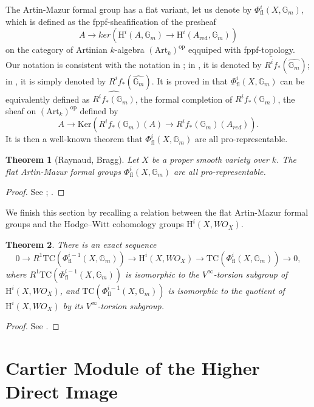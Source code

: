 \documentclass[a4paper,12pt,twoside]{report}
\newtheorem{theorem}{Theorem}[section]
\newcommand{\G}{\mathbb{G}}
\newcommand{\HH}{\mathrm{H}}
\newcommand{\TC}{\mathrm{TC}}
\newcommand{\red}{\mathrm{red}}
\newcommand{\art}{\mathrm{Art}}
\newcommand{\op}{\mathrm{op}}
\newcommand{\fl}{\mathrm{fl}}
\newcommand{\Ker}{\mathrm{Ker}}
\begin{document}
The Artin-Mazur formal group has a flat variant, let us denote by $\Phi_{\fl}^i(X,\G_m)$, 
which is defined as the fppf-sheafification of the presheaf 
\[A\rightarrow ker(\HH^i(A,\G_m)\rightarrow \HH^i(A_{\red},\G_m))\]
on the category of Artinian $k$-algebra $(\art_{k})^{\op}$ eqquiped with fppf-topology. 
Our notation is consistent with the notation in \cite{BO}; in \cite{Ray}, 
it is denoted by $\widetilde{R^if_*}(\widehat{\G_m})$; 
in \cite{Ek2}, it is simply denoted by $R^if_*(\widehat{\G_m})$. 
It is proved in \cite[10.6]{BO} that $\Phi_{\fl}^i(X,\G_m)$ 
can be equivalently defined as $\widehat{R^if_*(\G_m)}$, the formal completion of $R^if_*(\G_m)$, the sheaf on $(\art_{k})^{\op}$ defined by 
\[A\rightarrow \Ker(R^if_*(\G_m)(A)\rightarrow R^if_*(\G_m)(A_{red})).\]
It is then a well-known theorem that $\Phi_{\fl}^i(X,\G_m)$ are all pro-representable. 

\begin{theorem}[Raynaud, Bragg]
    Let $X$ be a proper smooth variety over $k$. 
    The flat Artin-Mazur formal groups $\Phi_{\fl}^i(X,\G_m)$ are all pro-representable. 
\end{theorem}

\begin{proof}
    See \cite[Theorem 10.8]{BO}; \cite[Theorem 4.1.2]{Ray}.
\end{proof} 

We finish this section by recalling a relation between the flat Artin-Mazur formal groups 
and the Hodge--Witt cohomology groups $\HH^i(X,WO_X)$. 

\begin{theorem}\label{Eke81}
There is an exact sequence 
    \begin{equation*}
        0 \rightarrow R^1\TC(\Phi^{i-1}_{\fl}(X,\G_m)) \rightarrow \HH^i(X,WO_X) \rightarrow \TC(\Phi^{i}_{\fl}(X,\G_m)) \rightarrow 0,
    \end{equation*}
    where $R^1\TC(\Phi^{i-1}_{\fl}(X,\G_m))$ is isomorphic to the $V^{\infty}$-torsion subgroup of $\HH^i(X,WO_X)$, 
    and $\TC(\Phi^{i-1}_{\fl}(X,\G_m))$ is isomorphic to the quotient of $\HH^i(X,WO_X)$ by its $V^{\infty}$-torsion subgroup. 
\end{theorem}

\begin{proof}
    See \cite[Proposition III.8.1]{Ek2}.
\end{proof}


\section{Cartier Module of the Higher Direct Image} 
\end{document}
